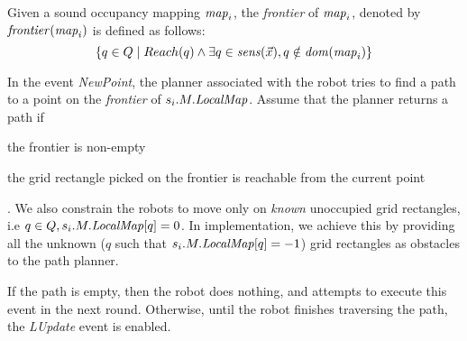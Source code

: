 \begin{definition}
    Given a sound occupancy mapping $\mathit{map}_i$, the \emph{frontier} of $\mathit{map}_i$, denoted by $\mathit{frontier}(\mathit{map}_i)$ is defined as follows:
    $$ \left\{ q\in Q \mid Reach(q) \wedge \exists q \in \mathit{sens}(\Vec{x}), q \notin \mathit{dom}(\mathit{map}_i)\right\} $$
\end{definition}

In the event \emph{NewPoint}, the planner associated with the robot tries to find a path to a point on the \emph{frontier} of $s_i.M.\mathit{LocalMap}$. Assume that the planner returns a path if \begin{inparaenum}[(a)]
                                                                                                                                                                                           \item the frontier is non-empty \item the grid rectangle picked on the frontier is reachable from the current point
\end{inparaenum}. We also constrain the robots to move only on \emph{known} unoccupied grid rectangles, i.e $q\in Q, s_i.M.\mathit{LocalMap}[q] = 0$. In implementation, we achieve this by providing all the unknown ($q$ such that $s_i.M.\mathit{LocalMap}[q] = -1$) grid rectangles as obstacles to the path planner.

If the path is empty, then the robot does nothing, and attempts to execute this event in the next round. Otherwise, until the robot finishes traversing the path, the \emph{LUpdate} event is enabled.

